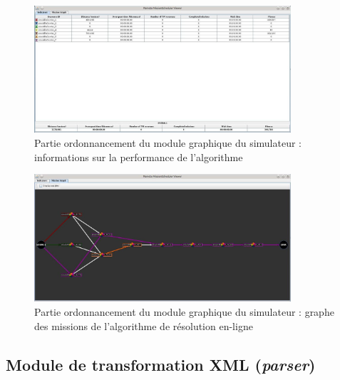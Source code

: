 \begin{figure}[h]
 \centering
 \includegraphics[width=0.85\textwidth]{chapitres/simulation/ordo2D-Infos.jpg}
 \caption{Partie ordonnancement du module graphique du simulateur : informations sur la performance de l'algorithme}
 \label{fig:simulation:ordonnancement2D}
\end{figure}

\begin{figure}[h]
 \centering
 \includegraphics[width=0.85\textwidth]{chapitres/simulation/ordo3D-Graphe.jpg}
 \caption{Partie ordonnancement du module graphique du simulateur : graphe des missions de l'algorithme de résolution en-ligne}
 \label{fig:simulation:ordonnancement2D-2}
\end{figure}

\subsection{Module de transformation XML (\textit{parser})}

